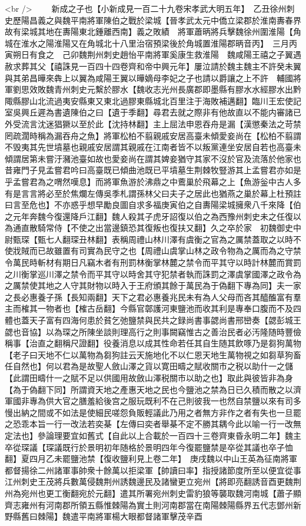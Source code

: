 <br />
　　新成之子也【小新成見一百二十九卷宋孝武大明五年】　乙丑徐州刺史歷陽昌義之與魏平南將軍陳伯之戰於梁城【晉孝武太元中僑立梁郡於淮南夀春界故有梁城其地在夀陽東北鍾離西南】義之敗績　將軍蕭昞將兵擊魏徐州圍淮陽【角城在淮水之陽淮陽又在角城北十八里治宿預梁後於角城置淮陽郡昞音丙】　三月丙寅朔日有食之　己卯魏荆州刺史趙怡平南將軍奚康生救淮陽　魏咸陽王禧之子翼遇赦求葬其父【禧誅見一百四十四卷齊和帝中興元年】屢泣請於魏主魏主不許癸未翼與其弟昌曄來犇上以翼為咸陽王翼以曄嫡母李妃之子也請以爵讓之上不許　輔國將軍劉思效敗魏青州刺史元繫於膠水【魏收志光州長廣郡即墨縣有膠水水經膠水出黔陬縣膠山北流過夷安縣東又東北過膠東縣城北百里注于海敗補邁翻】臨川王宏使記室吳興丘遲為書遺陳伯之曰【遺于季翻】尋君去就之際非有他故直以不能内審諸已外受流言沈迷猖獗以至於此【沈持林翻】主上屈法申恩吞舟是漏【漢懲秦法之苛禁罔疏濶時稱為漏吞舟之魚】將軍松柏不翦親戚安居高臺未傾愛妾尚在【松柏不翦謂不毁夷其先世墳墓也親戚安居謂其親戚在江南者皆不以叛黨連坐安居自若也高臺未傾謂居第未嘗汙瀦池臺如故也愛妾尚在謂其婢妾猶守其家不沒於官及流落於他家也昔雍門子見孟嘗君吟曰高臺既已傾曲池既已平墳墓生荆棘牧豎游其上孟嘗君亦如是乎孟嘗君為之喟然嘆息】而將軍魚游於沸鼎之中鷰巢於飛幕之上【魚游釡中古人多有是言言將必至於焦爛左傳吳季札謂孫林父曰夫子之居此也猶燕之巢於幕上杜預註曰言至危也】不亦惑乎想早勵良圖自求多福庚寅伯之自夀陽梁城擁衆八千來降【伯之元年奔魏今復還降戶江翻】魏人殺其子虎牙詔復以伯之為西豫州刺史未之任復以為通直散騎常侍【不使之出當邊鎮恐其復叛也復扶又翻】久之卒於家　初魏御史中尉甄琛【甄七人翻琛丑林翻】表稱周禮山林川澤有虞衡之官為之厲禁蓋取之以時不使戕賊而已故雖置有司實為民守之也【周禮山虞掌山林之政令物為之厲而為之守禁令萬民時斬材有期日凡竊木者有刑罰林衡掌林麓之禁令而平其守以時計林麓而賞罰之川衡掌巡川澤之禁令而平其守以時舍其守犯禁者執而誅罰之澤虞掌國澤之政令為之厲禁使其地之人守其財物以時入于王府頒其餘于萬民為于偽翻下專為同】夫一家之長必惠養子孫【長知兩翻】天下之君必惠養兆民未有為人父母而吝其醯醢富有羣主而榷其一物者也【榷古岳翻】今縣官鄣護河東鹽池而收其利是專奉口腹而不及四體也蓋天子富有四海何患於貧乞弛鹽禁與民共之録尚書事勰尚書邢巒奏【勰彭城王勰也音協】以為琛之所陳坐談則理高行之則事闕竊惟古之善治民者必汚隆随時豐儉稱事【治直之翻稱尺證翻】役養消息以成其性命若任其自生随其飲啄乃是芻狗萬物【老子曰天地不仁以萬物為芻狗註云天施地化不以仁恩天地生萬物視之如芻草狗畜任自然也】何以君為是故聖人斂山澤之貨以寛田疇之賦收關市之税以助什一之儲【此謂田疇什一之賦不足以供國用故斂山澤税關市以助之也】取此與彼皆非為身【為于偽翻下同】所謂資天地之產惠天地之民也今鹽池之禁為日已久積而散之以濟軍國非專為供大官之膳羞給後宫之服玩既利不在己則彼我一也然自禁鹽以來有司多慢出納之間或不如法是使細民嗟怨負販輕議此乃用之者無方非作之者有失也一旦罷之恐乖本旨一行一改法若奕棊【左傳曰奕者舉棊不定不勝其耦今此以喻一行一改無定法也】參論理要宜如舊式【自此以上合載於一百四十三卷齊東昏永明二年】魏主卒從琛議【琛議既行於景明初年随格於景明四年今復罷鹽禁是卒從其議也卒子恤翻】夏四月乙未罷鹽池禁【復收鹽利見上卷二年】　庚戌魏以中山王英為征南將軍都督揚徐二州諸軍事帥衆十餘萬以拒梁軍【帥讀曰率】指授諸節度所至以便宜從事江州刺史王茂將兵數萬侵魏荆州誘魏邊民及諸蠻更立宛州【將即亮翻誘音酉更魏荆州為宛州也更工衡翻宛於元翻】遣其所署宛州刺史雷豹狼等襲取魏河南城【蕭子顯齊志雍州有河南郡所領五縣惟棘陽為實土則河南郡當在南陽棘陽縣界五代志鄧州新野縣舊曰棘陽】魏遣平南將軍楊大眼都督諸軍擊茂辛酉